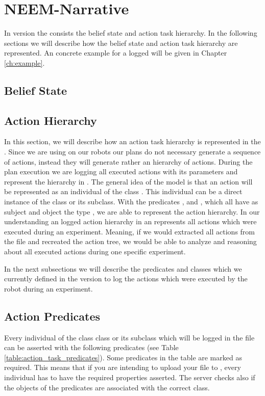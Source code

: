 \section{NEEM-Narrative}
\label{ch:narrative}
In version \neemversion the \neemnar consists the belief state and action task hierarchy. 
In the following sections we will describe how the belief state and action task hierarchy are represented.
An concrete example for a logged \neemnar will be given in Chapter \ref{ch:example}.

\subsection{Belief State}


\subsection{Action Hierarchy}
\label{ch:narrative,sec:actionHierarchy}
In this section, we will describe how an action task hierarchy is represented in the \neemnar. 
Since we are using \cram on our robots our plans do not necessary generate a sequence of actions, instead they will generate rather an hierarchy of actions.
During the plan execution we are logging all executed actions with its parameters and represent the hierarchy in \owl.
The general idea of the model is that an action will be represented as an individual of the class .
This individual can be a direct instance of the class  or its subclass.
With the predicates ,  and , which all have as subject and object the type , we are able to represent the action hierarchy.
In our understanding an logged action hierarchy in an \owl represents all actions which were executed during an experiment.
Meaning, if we would extracted all actions from the \owl file and recreated the action tree, we would be able to analyze and reasoning about all executed actions during one specific experiment.

In the next subsections we will describe the predicates and classes which we currently defined in the version \neemversion to log the actions which were executed by the robot during an experiment. 

\subsection{Action Predicates}
Every individual of the class  class or its subclass which will be logged in the \owl file can be asserted with the following predicates (see Table \ref{table:action_task_predicates}).
Some predicates in the table are marked as required.
This means that if you are intending to upload your \owl file to \openease, every  individual has to have the required properties asserted.
The \openease server checks also if the objects of the predicates are associated with the correct class.

